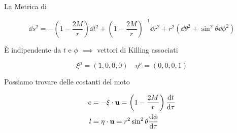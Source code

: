 \begin{frame}[t]{La Metrica di \Sh}

    \begin{equation*}
        \dd s^2 = - \left( 1 - \frac{2M}{r} \right) \dd t^2
        + \left( 1 - \frac{2M}{r} \right)^{-1} \dd r^2
        + r^2 (\dd \theta^2 + \sin^2 \theta \dd \phi^2)
    \end{equation*}
    
    \vspace{0.5cm}

    \`E indipendente da $t$ e $\phi$ $\implies$ vettori di Killing associati
    
    \begin{equation*}
        \xi^\mu = \left( 1, 0, 0, 0 \right) \quad \eta^\mu = \left( 0, 0, 0, 1 \right)
    \end{equation*}

    Possiamo trovare delle costanti del moto

    \begin{align*}
        e &= - \mathbf{\xi \cdot u} = \left(1 - \frac{2M}{r} \right) \dv{t}{\tau} \\
        l &= \mathbf{\eta \cdot u} = r^2 \sin^2 \theta \dv{\phi}{\tau}
    \end{align*}

\end{frame}


